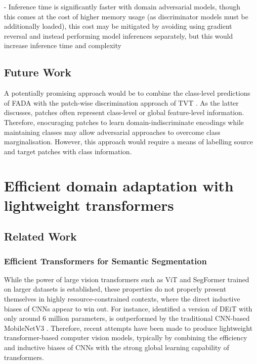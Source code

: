 \documentclass[a4paper,12pt]{report}
\begin{document}
- Inference time is significantly faster with domain adversarial models, though this comes at the cost of higher memory usage (as discriminator models must be additionally loaded), this cost may be mitigated by avoiding using gradient reversal and instead performing model inferences separately, but this would increase inference time and complexity

\section{Future Work}
A potentially promising approach would be to combine the class-level predictions of FADA \cite{wang_classes_2020} with the patch-wise discrimination approach of TVT \cite{yang_tvt_2021}. As the latter discusses, patches often represent class-level or global feature-level information. Therefore, enocuraging patches to learn domain-indiscriminate encodings while maintaining classes may allow adversarial approaches to overcome class marginalisation. However, this approach would require a means of labelling source and target patches with class information.

\chapter{Efficient domain adaptation with lightweight transformers}

\section{Related Work}

\subsection{Efficient Transformers for Semantic Segmentation}

While the power of large vision transformers such as ViT and SegFormer trained on larger datasets is established, these properties do not properly present themselves in highly resource-constrained contexts, where the direct inductive biases of CNNs appear to win out. For instance, \cite{mehta_mobilevit_2022} identified a version of DEiT \cite{touvron_training_2021} with only around 6 million parameters, is outperformed by the traditional CNN-based MobileNetV3 \cite{howard_searching_2019}. Therefore, recent attempts have been made to produce lightweight transformer-based computer vision models, typically by combining the efficiency and inductive biases of CNNs with the strong global learning capability of transformers.
\end{document}
